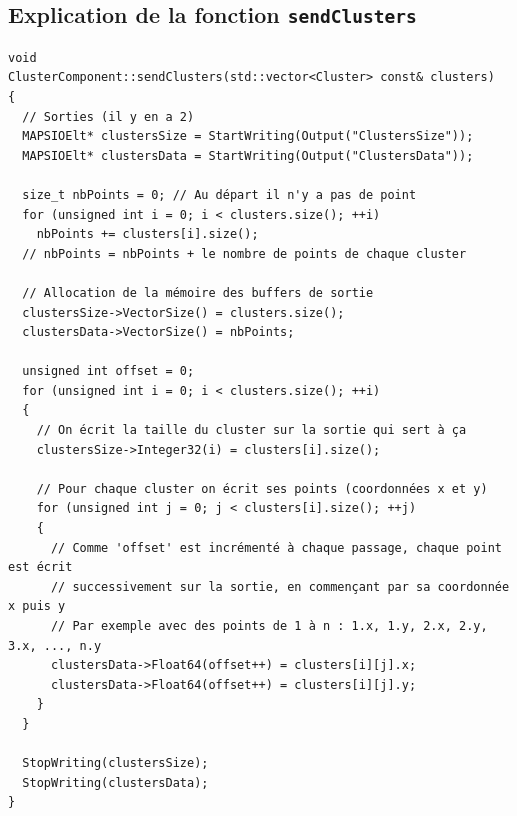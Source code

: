 \subsection{Explication de la fonction \lstinline{sendClusters}}
\cpp
\begin{lstlisting}
void
ClusterComponent::sendClusters(std::vector<Cluster> const& clusters)
{
  // Sorties (il y en a 2)
  MAPSIOElt* clustersSize = StartWriting(Output("ClustersSize"));
  MAPSIOElt* clustersData = StartWriting(Output("ClustersData"));

  size_t nbPoints = 0; // Au départ il n'y a pas de point
  for (unsigned int i = 0; i < clusters.size(); ++i)
    nbPoints += clusters[i].size();
  // nbPoints = nbPoints + le nombre de points de chaque cluster

  // Allocation de la mémoire des buffers de sortie
  clustersSize->VectorSize() = clusters.size();
  clustersData->VectorSize() = nbPoints;

  unsigned int offset = 0;
  for (unsigned int i = 0; i < clusters.size(); ++i)
  {
    // On écrit la taille du cluster sur la sortie qui sert à ça
    clustersSize->Integer32(i) = clusters[i].size();

    // Pour chaque cluster on écrit ses points (coordonnées x et y)
    for (unsigned int j = 0; j < clusters[i].size(); ++j)
    {
      // Comme 'offset' est incrémenté à chaque passage, chaque point est écrit
      // successivement sur la sortie, en commençant par sa coordonnée x puis y
      // Par exemple avec des points de 1 à n : 1.x, 1.y, 2.x, 2.y, 3.x, ..., n.y
      clustersData->Float64(offset++) = clusters[i][j].x;
      clustersData->Float64(offset++) = clusters[i][j].y;
    }
  }

  StopWriting(clustersSize);
  StopWriting(clustersData);
}
\end{lstlisting}

